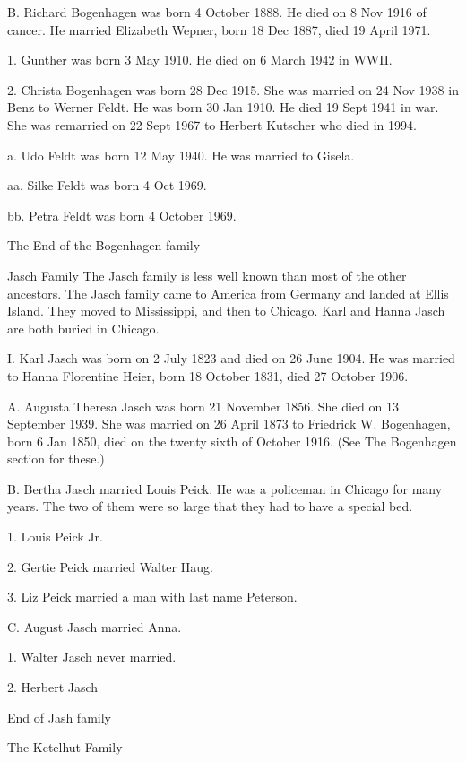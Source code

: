 \documentclass[a4paper]{article}
\begin{document}
B. Richard Bogenhagen was born 4 October 1888.  He died on 8 Nov 1916 of cancer.  He married Elizabeth Wepner, born 18 Dec 1887, died 19 April 1971.  
 
1. Gunther was born 3 May 1910.  He died on 6 March 1942 in WWII.

2. Christa Bogenhagen was born 28 Dec 1915.  She was married on 24 Nov 1938 in Benz to Werner Feldt.  He was born 30 Jan 1910. He died 19 Sept 1941 in war. She was remarried on 22 Sept 1967 to Herbert Kutscher who died in 1994. 

a. Udo Feldt was born 12 May 1940.  He was married to Gisela.

aa. Silke Feldt was born 4 Oct 1969.

bb. Petra Feldt was born 4 October 1969.
	
\vskip 4mm
The End of the Bogenhagen family


\pagebreak

{\Huge \noindent Jasch Family}
\vskip 5mm
	The Jasch family is less well known than most of the other ancestors. The Jasch family came to America from Germany and landed at Ellis Island.  They moved to Mississippi, and then to Chicago.  Karl and Hanna Jasch are both buried in Chicago.  

I.  Karl Jasch was born on 2 July 1823 and died on 26 June 1904.  He was married to Hanna 
Florentine Heier, born 18 October 1831, died 27 October 1906.
 
A. Augusta Theresa Jasch was born 21 November 1856.  She died on 13 September 1939. She was married on 26 April 1873 to Friedrick W. Bogenhagen, born 6 Jan 1850, died on the twenty sixth of	 October 1916.  (See The Bogenhagen section for these.)
 
B. Bertha Jasch married Louis Peick.  He was a policeman in Chicago for many years. The two of them were so large that they had to have a special bed.  
 
1. Louis Peick Jr.

2. Gertie Peick married Walter Haug.

3. Liz Peick married a man with last name Peterson. 

C. August Jasch married Anna.

1. Walter Jasch never married.   

2. Herbert Jasch



\vskip 4mm
End of Jash family

\pagebreak

{\Huge \noindent The Ketelhut Family}
\vskip 5mm
\end{document}
